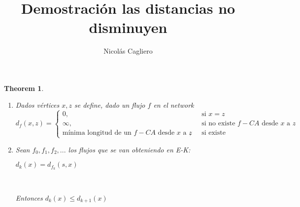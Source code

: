 \documentclass[11pt]{article}
\title{Demostración las distancias no disminuyen}
\author{Nicolás Cagliero}
\newtheorem{theorem}{Theorem}
\begin{document}
\maketitle
\begin{theorem}\par
\

\begin{enumerate}
\item Dados vértices $x, z$ se define, dado un flujo $f$ en el network
\[   
d_f(x,z) = 
     \begin{cases}
       \text{\(0\)}, &\quad\text{si \(x=z\)}\\
       \text{\(\infty\)}, &\quad\text{si no existe \(f-CA\) desde \(x\) a \(z\)}\\
       \text{mínima longitud de un \(f-CA\) desde \(x\) a \(z\)}, &\quad\text{si existe}
     \end{cases}
\]

\item Sean $f_0, f_1, f_2, ...$  los flujos que se van obteniendo en E-K:
\begin{center}
	$d_k(x) = d_{f_k}(s, x)$\par
\end{center}
\

Entonces $d_k(x) \le d_{k+1}(x)$\par
\

\end{enumerate}

\end{theorem}
\end{document}
